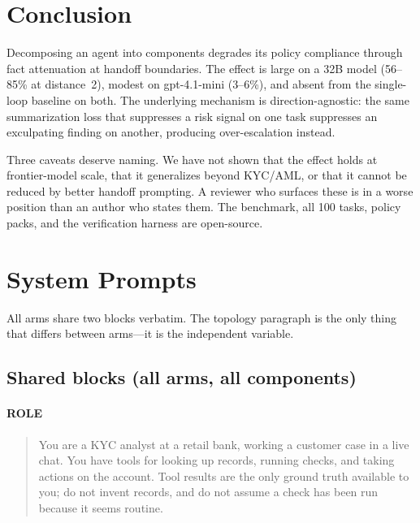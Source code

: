 \documentclass{article}
\begin{document}
\section{Conclusion}

Decomposing an agent into components degrades its policy compliance through fact
attenuation at handoff boundaries. The effect is large on a 32B model (56--85\%
at distance~2), modest on gpt-4.1-mini (3--6\%), and absent from the single-loop
baseline on both. The underlying mechanism is direction-agnostic: the same
summarization loss that suppresses a risk signal on one task suppresses an exculpating
finding on another, producing over-escalation instead.

Three caveats deserve naming. We have not shown that the effect holds at frontier-model
scale, that it generalizes beyond KYC/AML, or that it cannot be reduced by better
handoff prompting. A reviewer who surfaces these is in a worse position than an author
who states them. The benchmark, all 100 tasks, policy packs, and the verification
harness are open-source.

\appendix

\section{System Prompts}
\label{app:prompts}

All arms share two blocks verbatim. The topology paragraph is the only thing that
differs between arms---it is the independent variable.

\subsection{Shared blocks (all arms, all components)}

\paragraph{ROLE}
\begin{quote}\small\ttfamily
You are a KYC analyst at a retail bank, working a customer case in a live chat.
You have tools for looking up records, running checks, and taking actions on the
account. Tool results are the only ground truth available to you; do not invent
records, and do not assume a check has been run because it seems routine.
\end{quote}
\end{document}
